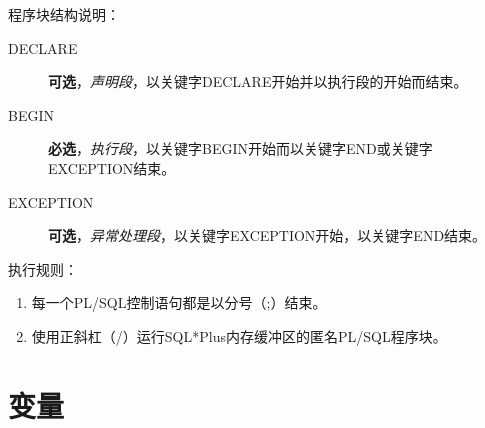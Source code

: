\documentclass[11pt, a4paper, oneside, UTF8]{ctexbook}
\let\kaishu\relax %
\begin{document}
程序块结构说明：
\begin{description}
  \item[DECLARE] {\bfseries\kaishu 可选}，\textit{声明段}，以关键字DECLARE开始并以执行段的开始而结束。
  \item[BEGIN] {\bfseries\kaishu 必选}，\textit{执行段}，以关键字BEGIN开始而以关键字END或关键字EXCEPTION结束。
  \item[EXCEPTION] {\bfseries\kaishu 可选}，\textit{异常处理段}，以关键字EXCEPTION开始，以关键字END结束。
\end{description}
执行规则：
\begin{enumerate}
  \item 每一个PL/SQL控制语句都是以分号（;）结束。
  \item 使用正斜杠（/）运行SQL*Plus内存缓冲区的匿名PL/SQL程序块。
\end{enumerate}

\section{变量}

\end{document}

